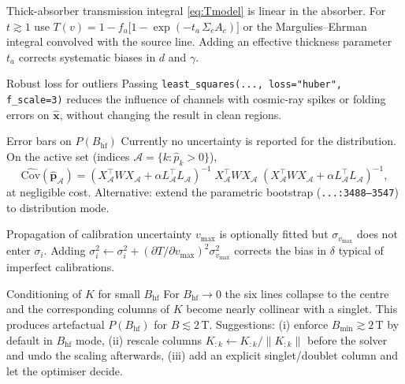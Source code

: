 \documentclass[11pt,a4paper]{article}
\newcommand{\BHF}{B_{\mathrm{hf}}}
\newcommand{\code}[1]{\texttt{\small #1}}
\newcommand{\file}[1]{\textcolor{black!70}{\texttt{\small #1}}}
\begin{document}
\begin{mejora}{Thick-absorber transmission integral}\label{mej:thickness}
\eqref{eq:Tmodel} is linear in the absorber. For $t \gtrsim 1$ use
\(T(v) = 1 - f_a\bigl[1 - \exp(-t_a\,\Sigma_c A_c)\bigr]\)
or the Margulies--Ehrman integral convolved with the source line. Adding an effective thickness parameter $t_a$ corrects systematic biases in $d$ and $\gamma$.
\end{mejora}

\begin{mejora}{Robust loss for outliers}\label{mej:robust}
Passing \code{least\_squares(..., loss="huber", f\_scale=3)} reduces the influence of channels with cosmic-ray spikes or folding errors on $\hat{\bm x}$, without changing the result in clean regions.
\end{mejora}

\begin{mejora}{Error bars on $P(\BHF)$}\label{mej:perr}
Currently no uncertainty is reported for the distribution. On the active set (indices $\mathcal A=\{k:\hat p_k>0\}$),
\[
  \widehat{\mathrm{Cov}}(\hat{\bm p}_{\mathcal A}) = (X_{\mathcal A}^\top W X_{\mathcal A}+\alpha L_{\mathcal A}^\top L_{\mathcal A})^{-1}
  \;X_{\mathcal A}^\top W X_{\mathcal A}\;(X_{\mathcal A}^\top W X_{\mathcal A}+\alpha L_{\mathcal A}^\top L_{\mathcal A})^{-1},
\]
at negligible cost. Alternative: extend the parametric bootstrap (\file{...:3488--3547}) to distribution mode.
\end{mejora}

\begin{mejora}{Propagation of calibration uncertainty}\label{mej:vmax}
$v_{\max}$ is optionally fitted but $\sigma_{v_{\max}}$ does not enter $\sigma_i$. Adding
\(\sigma_i^{2}\leftarrow \sigma_i^{2}+(\partial T/\partial v_{\max})^{2}\sigma_{v_{\max}}^{2}\) corrects the bias in $\delta$ typical of imperfect calibrations.
\end{mejora}

\begin{mejora}{Conditioning of $K$ for small $\BHF$}\label{mej:cond}
For $\BHF\to 0$ the six lines collapse to the centre and the corresponding columns of $K$ become nearly collinear with a singlet. This produces artefactual $P(\BHF)$ for $B\lesssim 2\,$T. Suggestions: (i) enforce $B_{\min}\gtrsim 2\,$T by default in $\BHF$ mode, (ii) rescale columns $K_{:k}\leftarrow K_{:k}/\|K_{:k}\|$ before the solver and undo the scaling afterwards, (iii) add an explicit singlet/doublet column and let the optimiser decide.
\end{mejora}
\end{document}
